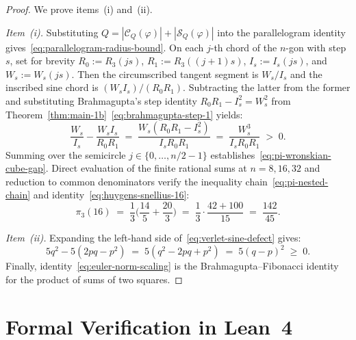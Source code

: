 \documentclass[11pt,a4paper]{article}
\theoremstyle{plain}
\theoremstyle{definition}
\begin{document}
\begin{proof}
We prove items~(i) and~(ii).

\emph{Item~(i).} Substituting $Q = |\mathcal{C}_Q(\varphi)| + |\mathcal{S}_Q(\varphi)|$ into the parallelogram identity gives~\eqref{eq:parallelogram-radius-bound}. On each $j$-th chord of the $n$-gon with step $s$, set for brevity $R_0 := R_3(js)$, $R_1 := R_3((j+1)s)$, $I_s := I_s(js)$, and $W_s := W_s(js)$. Then the circumscribed tangent segment is $W_s / I_s$ and the inscribed sine chord is $(W_s I_s)/(R_0 R_1)$. Subtracting the latter from the former and substituting Brahmagupta's step identity $R_0 R_1 - I_s^2 = W_s^2$ from Theorem~\ref{thm:main-1b}~\eqref{eq:brahmagupta-step-1} yields:
\begin{equation*}
  \frac{W_s}{I_s} - \frac{W_s I_s}{R_0 R_1} \;=\; \frac{W_s(R_0 R_1 - I_s^2)}{I_s R_0 R_1} \;=\; \frac{W_s^3}{I_s R_0 R_1} \;>\; 0.
\end{equation*}
Summing over the semicircle $j \in \{0, \dots, n/2 - 1\}$ establishes~\eqref{eq:pi-wronskian-cube-gap}. Direct evaluation of the finite rational sums at $n = 8, 16, 32$ and reduction to common denominators verify the inequality chain~\eqref{eq:pi-nested-chain} and identity~\eqref{eq:huygens-snellius-16}:
\begin{equation*}
  \pi_3(16) \;=\; \frac{1}{3}\biggl(\frac{14}{5} + \frac{20}{3}\biggr) \;=\; \frac{1}{3}\cdot\frac{42 + 100}{15} \;=\; \frac{142}{45}.
\end{equation*}

\emph{Item~(ii).} Expanding the left-hand side of~\eqref{eq:verlet-sine-defect} gives:
\begin{equation*}
  5q^2 - 5(2pq - p^2) \;=\; 5(q^2 - 2pq + p^2) \;=\; 5(q - p)^2 \;\ge\; 0.
\end{equation*}
Finally, identity~\eqref{eq:euler-norm-scaling} is the Brahmagupta--Fibonacci identity for the product of sums of two squares.
\end{proof}

\section{Formal Verification in Lean~4}
\label{sec:lean4}
\end{document}
